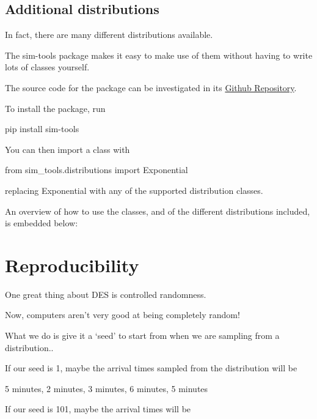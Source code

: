 \documentclass[
  letterpaper,
  DIV=11,
  numbers=noendperiod]{scrreprt}
\newenvironment{Shaded}{\begin{snugshade}}{\end{snugshade}}
\newcommand{\ImportTok}[1]{\textcolor[rgb]{0.00,0.46,0.62}{#1}}
\newcommand{\NormalTok}[1]{\textcolor[rgb]{0.00,0.23,0.31}{#1}}
\newcommand{\OperatorTok}[1]{\textcolor[rgb]{0.37,0.37,0.37}{#1}}
\begin{document}
\section{Additional distributions}\label{additional-distributions}

In fact, there are many different distributions available.

The sim-tools package makes it easy to make use of them without having
to write lots of classes yourself.

The source code for the package can be investigated in its
\href{https://github.com/TomMonks/sim-tools}{Github Repository}.

To install the package, run

\begin{Shaded}
\begin{Highlighting}[]
\NormalTok{pip install sim}\OperatorTok{{-}}\NormalTok{tools}
\end{Highlighting}
\end{Shaded}

You can then import a class with

\begin{Shaded}
\begin{Highlighting}[]
\ImportTok{from}\NormalTok{ sim\_tools.distributions }\ImportTok{import}\NormalTok{ Exponential}
\end{Highlighting}
\end{Shaded}

replacing Exponential with any of the supported distribution classes.

An overview of how to use the classes, and of the different
distributions included, is embedded below:

\chapter{Reproducibility}\label{sec-reproducibility}

One great thing about DES is controlled randomness.

Now, computers aren't very good at being completely random!

What we do is give it a `seed' to start from when we are sampling from a
distribution..

If our seed is 1, maybe the arrival times sampled from the distribution
will be

5 minutes, 2 minutes, 3 minutes, 6 minutes, 5 minutes

If our seed is 101, maybe the arrival times will be
\end{document}
